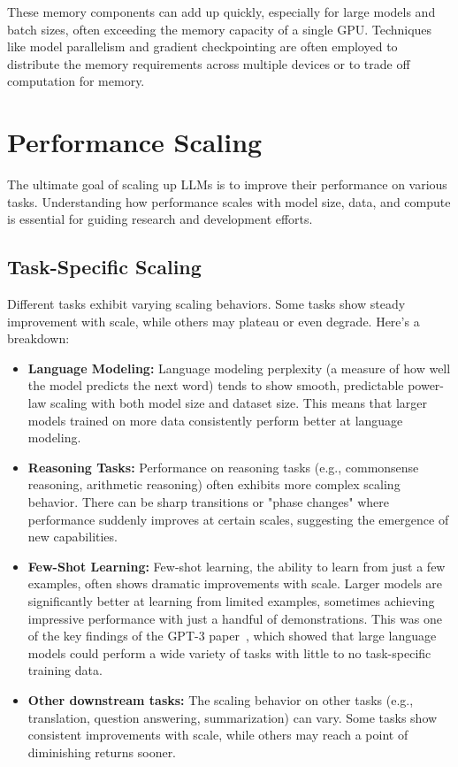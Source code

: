 These memory components can add up quickly, especially for large models and batch sizes, often exceeding the memory capacity of a single GPU. Techniques like model parallelism and gradient checkpointing are often employed to distribute the memory requirements across multiple devices or to trade off computation for memory.

\section{Performance Scaling}
\label{sec:performance_scaling}

The ultimate goal of scaling up LLMs is to improve their performance on various tasks. Understanding how performance scales with model size, data, and compute is essential for guiding research and development efforts.

\subsection{Task-Specific Scaling}
\noindent
Different tasks exhibit varying scaling behaviors. Some tasks show steady improvement with scale, while others may plateau or even degrade. Here's a breakdown:

\begin{itemize}[noitemsep]
    \item \textbf{Language Modeling:}  Language modeling perplexity (a measure of how well the model predicts the next word) tends to show smooth, predictable power-law scaling with both model size and dataset size. This means that larger models trained on more data consistently perform better at language modeling.
    \item \textbf{Reasoning Tasks:}  Performance on reasoning tasks (e.g., commonsense reasoning, arithmetic reasoning) often exhibits more complex scaling behavior. There can be sharp transitions or "phase changes" where performance suddenly improves at certain scales, suggesting the emergence of new capabilities.
    \item \textbf{Few-Shot Learning:}  Few-shot learning, the ability to learn from just a few examples, often shows dramatic improvements with scale. Larger models are significantly better at learning from limited examples, sometimes achieving impressive performance with just a handful of demonstrations. This was one of the key findings of the GPT-3 paper~\cite{brown2020language}, which showed that large language models could perform a wide variety of tasks with little to no task-specific training data.
    \item \textbf{Other downstream tasks:} The scaling behavior on other tasks (e.g., translation, question answering, summarization) can vary. Some tasks show consistent improvements with scale, while others may reach a point of diminishing returns sooner.
\end{itemize}


